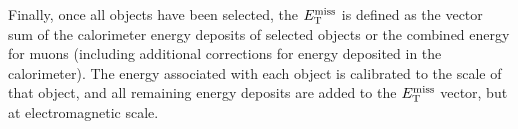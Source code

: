 Finally, once all objects have been selected, the $E_{\mathrm{T}}^{\mathrm{miss}}$ is defined as the vector sum of the calorimeter energy deposits of selected objects or the combined energy for muons (including additional corrections for energy deposited in the calorimeter).
The energy associated with each object is calibrated to the scale of that object, and all remaining energy deposits are added to the $E_{\mathrm{T}}^{\mathrm{miss}}$ vector, but at electromagnetic scale.



